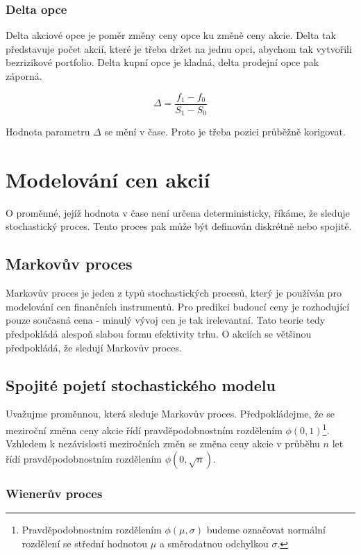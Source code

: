 \documentclass[a4paper]{book}
\begin{document}
\subsection{Delta opce}
Delta akciové opce je poměr změny ceny opce ku změně ceny akcie. Delta tak představuje počet akcií, které je třeba držet na jednu opci, abychom tak vytvořili bezrizikové portfolio. Delta kupní opce je kladná, delta prodejní opce pak záporná.

\begin{equation*}
\Delta = \frac{f_1 - f_0}{S_1 - S_0}
\end{equation*}

\noindent Hodnota parametru $\Delta$ se mění v čase. Proto je třeba pozici průběžně korigovat.

\chapter{Modelování cen akcií}
O proměnné, jejíž hodnota v čase není určena deterministicky, říkáme, že sleduje stochastický proces. Tento proces pak může být definován diskrétně nebo spojitě.

\section{Markovův proces}
Markovův proces je jeden z typů stochastických procesů, který je používán pro modelování cen finančních instrumentů. Pro predikci budoucí ceny je rozhodující pouze současná cena - minulý vývoj cen je tak irelevantní. Tato teorie tedy předpokládá alespoň slabou formu efektivity trhu.
O akciích se většinou předpokládá, že sledují Markovův proces.

\section{Spojité pojetí stochastického modelu}
Uvažujme proměnnou, která sleduje Markovův proces. Předpokládejme, že se meziroční změna ceny akcie řídí pravděpodobnostním rozdělením $\phi(0,1)$\footnote{Pravděpodobnostním rozdělením $\phi(\mu, \sigma)$ budeme označovat normální rozdělení se střední hodnotou $\mu$ a směrodatnou odchylkou $\sigma$.}. Vzhledem k nezávislosti meziročních změn se změna ceny akcie v průběhu $n$ let řídí pravděpodobnostním rozdělením $\phi(0, \sqrt{n})$.

\subsection{Wienerův proces}
\end{document}
